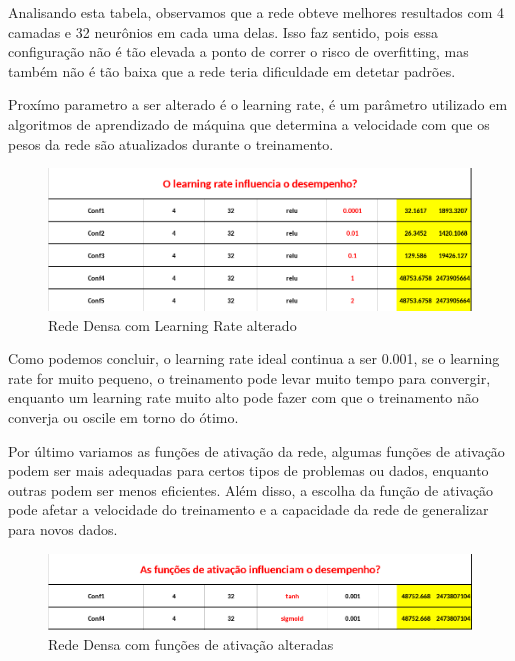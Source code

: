 \documentclass[10pt]{article}
\begin{document}
Analisando esta tabela, observamos que a rede obteve melhores 
resultados com 4 camadas e 32 neurônios em cada uma delas. Isso faz sentido, 
pois essa configuração não é tão elevada a ponto de correr o risco de 
overfitting, mas também não é tão baixa que a rede teria dificuldade 
em detetar padrões.

\vspace{1cm}

Proxímo parametro a ser alterado é o learning rate, é um parâmetro utilizado 
em algoritmos de aprendizado de máquina que determina a velocidade com que 
os pesos da rede são atualizados durante o treinamento.

\begin{figure}[htb]
  \centering
  \includegraphics[width=\linewidth]{img/deep_lr.png}
  \caption{Rede Densa com Learning Rate alterado}
  \label{fig:deep_lr}
\end{figure}

Como podemos concluir, o learning rate ideal continua a ser 0.001,
se o learning rate for muito pequeno, o treinamento pode levar muito 
tempo para convergir, enquanto um learning rate muito alto pode fazer 
com que o treinamento não converja ou oscile em torno do ótimo.

\newpage
Por último variamos as funções de ativação da rede, algumas funções de 
ativação podem ser mais adequadas para certos tipos de problemas ou dados, 
enquanto outras podem ser menos eficientes. Além disso, a escolha da função 
de ativação pode afetar a velocidade do treinamento e a capacidade da rede 
de generalizar para novos dados.

\begin{figure}[htb]
  \centering
  \includegraphics[width=\linewidth]{img/deep_ativacao.png}
  \caption{Rede Densa com funções de ativação alteradas}
  \label{fig:deep_ativacao}
\end{figure}
\end{document}
